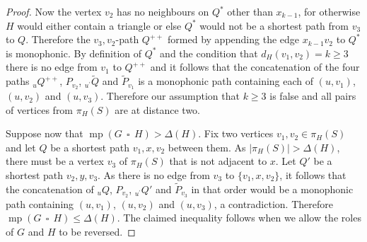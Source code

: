 \documentclass[10pt,a4paper]{amsart}
\DeclareMathOperator {\mono} {mp}
\DeclareMathOperator{\cp}{\,\square\,}
\begin{document}
\begin{proof}
Now the vertex $v_2$ has no neighbours on $Q^*$ other than $x_{k-1}$, for otherwise $H$ would either contain a triangle or else $Q^*$ would not be a shortest path from $v_3$ to $Q$. Therefore the $v_3,v_2$-path $Q^{++}$ formed by appending the edge $x_{k-1}v_2$ to $Q^*$ is monophonic. By definition of $Q^*$ and the condition that $d_H(v_1,v_2) = k \geq 3$ there is no edge from $v_1$ to $Q^{++}$ and it follows that the concatenation of the four paths $_uQ^{++}$, $P_{v_2}$, $_{u^{\prime }}\widetilde{Q}$ and $\widetilde{P}_{v_1}$ is a monophonic path containing each of $(u,v_1)$, $(u,v_2)$ and $(u,v_3)$. Therefore our assumption that $k \geq 3$ is false and all pairs of vertices from $\pi _H(S)$ are at distance two.

Suppose now that $\mono (G \cp H) > \Delta (H)$. Fix two vertices $v_1,v_2 \in \pi _H(S)$ and let $Q$ be a shortest path $v_1,x,v_2$ between them. As $|\pi _H(S)| > \Delta (H)$, there must be a vertex $v_3$ of $\pi _H(S)$ that is not adjacent to $x$. Let $Q'$ be a shortest path $v_2,y,v_3$. As there is no edge from $v_3$ to $\{ v_1,x,v_2\} $, it follows that the concatenation of $_uQ$, $P_{v_2}$, $_{u^{\prime }}Q'$ and $\widetilde{P}_{v_3}$ in that order would be a monophonic path containing $(u,v_1)$, $(u,v_2)$ and $(u,v_3)$, a contradiction. Therefore $\mono (G \cp H) \leq \Delta (H)$. The claimed inequality follows when we allow the roles of $G$ and $H$ to be reversed.
\end{proof}
\end{document}
